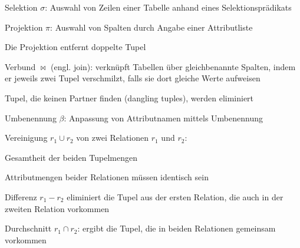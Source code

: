\documentclass[a4paper]{article}
\begin{document}
\begin{multicols}{3}
\begin{itemize*}
    \item Selektion $\sigma$: Auswahl von Zeilen einer Tabelle anhand eines Selektionsprädikats
    \item Projektion $\pi$: Auswahl von Spalten durch Angabe einer Attributliste
    \begin{itemize*}
        \item Die Projektion entfernt doppelte Tupel
    \end{itemize*}
    \item Verbund $\bowtie$ (engl. join): verknüpft Tabellen über gleichbenannte Spalten, indem er jeweils zwei Tupel verschmilzt, falls sie dort gleiche Werte aufweisen
    \begin{itemize*}
        \item Tupel, die keinen Partner finden (dangling tuples), werden eliminiert
    \end{itemize*}
    \item Umbenennung $\beta$: Anpassung von Attributnamen mittels Umbenennung
    \item Vereinigung $r_1 \cup r_2$ von zwei Relationen $r_1$ und $r_2$:
    \begin{itemize*}
        \item Gesamtheit der beiden Tupelmengen
        \item Attributmengen beider Relationen müssen identisch sein
    \end{itemize*}
    \item Differenz $r_1 - r_2$ eliminiert die Tupel aus der ersten Relation, die auch in der zweiten Relation vorkommen
    \item Durchschnitt $r_1 \cap r_2$: ergibt die Tupel, die in beiden Relationen gemeinsam vorkommen
\end{itemize*}



\end{multicols}
\end{document}
